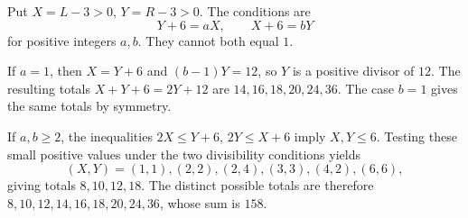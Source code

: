 Put $X=L-3>0$, $Y=R-3>0$. The conditions are
\[
Y+6=aX,\qquad X+6=bY
\]
for positive integers $a,b$. They cannot both equal $1$.

If $a=1$, then $X=Y+6$ and $(b-1)Y=12$, so $Y$ is a positive divisor of $12$. The resulting totals $X+Y+6=2Y+12$ are $14,16,18,20,24,36$. The case $b=1$ gives the same totals by symmetry.

If $a,b\ge2$, the inequalities $2X\le Y+6$, $2Y\le X+6$ imply $X,Y\le6$. Testing these small positive values under the two divisibility conditions yields
\[
(X,Y)=(1,1),(2,2),(2,4),(3,3),(4,2),(6,6),
\]
giving totals $8,10,12,18$. The distinct possible totals are therefore $8,10,12,14,16,18,20,24,36$, whose sum is $\boxed{158}$.
